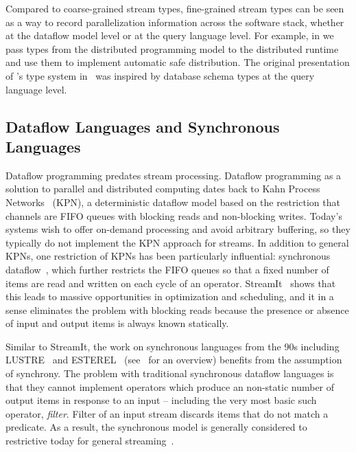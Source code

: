 Compared to coarse-grained stream types, fine-grained stream types can be seen as a way to record parallelization information across the software stack, whether at the dataflow model level or at the query language level.
For example, in  we pass types from the distributed programming model to the distributed runtime and use them to implement automatic safe distribution.
The original presentation of 's type system in~ was inspired by database schema types at the query language level.

\subsection{Dataflow Languages and Synchronous Languages}

Dataflow programming predates stream processing.
Dataflow programming as a solution to parallel and distributed computing
dates back to Kahn Process Networks~\cite{gilles1974semantics} (KPN), a deterministic dataflow model based on the restriction that channels are FIFO queues with blocking reads and non-blocking writes. Today's systems wish to offer on-demand processing and avoid arbitrary buffering, so they typically do not implement the KPN approach for streams.
In addition to general KPNs, one restriction of KPNs has been particularly influential: synchronous dataflow~\cite{lee1987synchronous}, which further restricts the FIFO queues so that a fixed number of items are read and written on each cycle of an operator. StreamIt~\cite{thies2002streamit} shows that this leads to massive opportunities in optimization and scheduling, and it in a sense eliminates the problem with blocking reads because the presence or absence of input and output items is always known statically.

Similar to StreamIt,
the work on synchronous languages from the 90s including LUSTRE~\cite{halbwachs1991synchronous} and ESTEREL~\cite{berry1992esterel} (see~\cite{BCEHlGdS2003SL} for an overview) benefits from the assumption of
synchrony.
The problem with traditional synchronous dataflow languages is that they cannot implement operators which produce an non-static number of output items in response to an input -- including the very most basic such operator, \emph{filter}. Filter of an input stream discards items that do not match a predicate. As a result, the synchronous model is generally considered to restrictive today for general streaming~\cite{schneider2013safe}.

